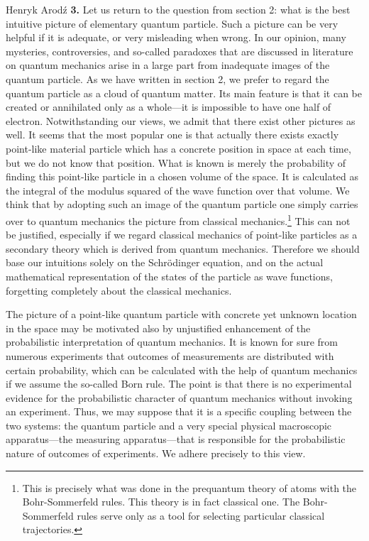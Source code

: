 \begin{artengenv}{Henryk Arod\'z}
{\bf 3.} Let us return to the question from section 2: what is the best intuitive picture of elementary quantum particle. Such a picture can be very helpful if it is adequate, or very misleading when wrong. In our opinion, many mysteries, controversies, and so-called paradoxes that are discussed in literature on quantum mechanics arise in a large part from inadequate images of the quantum particle. As we have written in section 2, we prefer to regard
 the quantum particle as a cloud of quantum matter. Its main feature is that it can be created or annihilated only as a whole---it is impossible to have one half of electron. Notwithstanding our views, we admit that there exist other pictures as well. It seems that the most popular one is that actually there exists exactly point-like material particle which has a concrete position in space at each time, but we do not know that position. What is known is merely the probability of finding this point-like particle in a chosen volume of the space. It is calculated as the integral of the modulus squared of the wave function over that volume. We think that by adopting such an image of the quantum particle one simply carries over to quantum mechanics the picture from classical mechanics.\footnote{This is precisely what was done in the prequantum theory of atoms with the Bohr-Sommerfeld rules. This theory is in fact classical one. The Bohr-Sommerfeld rules serve only as a tool for selecting particular classical trajectories.} This can not be justified, especially if we regard classical mechanics of point-like particles as a secondary theory which is derived from quantum mechanics. Therefore we should base our intuitions solely on the Schr\"odinger equation, and on the actual mathematical representation of the states of the particle as wave functions, forgetting completely about the classical mechanics. 

The picture of a point-like quantum particle with concrete yet unknown location in the space may be motivated also by unjustified enhancement of the probabilistic interpretation of quantum mechanics. It is known for sure from numerous experiments that outcomes of measurements are distributed with certain probability, which can be calculated with the help of quantum mechanics if we assume the
so-called Born rule. The point is that there is no experimental evidence for the probabilistic character of quantum mechanics without invoking an experiment. Thus, we may suppose that it is a specific coupling between the two systems: the quantum particle and a very special physical macroscopic apparatus---the measuring apparatus---that is responsible for the probabilistic nature of outcomes of experiments. We adhere precisely to this view. 


\end{artengenv}
